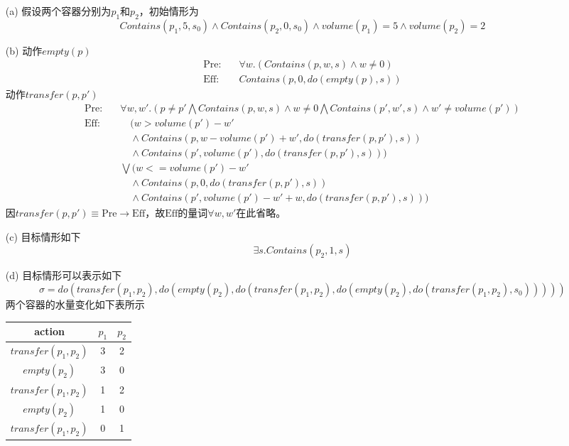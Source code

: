 \documentclass[a4paper, 11pt]{article}
\begin{document}
\begin{answer}
\begin{itemize}
    \item [(a)] 假设两个容器分别为$p_1$和$p_2$，初始情形为
    \[Contains(p_1,5,s_0)\land Contains(p_2,0,s_0)\land volume(p_1)=5\land volume(p_2)=2\]
    \item [(b)] 动作$empty(p)$
    \[\begin{aligned}
        \text{Pre:}\quad & \forall w.(Contains(p,w,s)\land w\ne 0)\\
        \text{Eff:}\quad & Contains(p,0,do(empty(p),s))
    \end{aligned}\]
    动作$transfer(p,p')$
    \[\begin{aligned}
        \text{Pre:}\quad & \forall w,w'.(p\ne p'\bigwedge Contains(p,w,s)\land w\ne 0\bigwedge Contains(p',w',s)\land w'\ne volume(p'))\\
        \text{Eff:}\quad & \quad (w > volume(p')-w'\\
        &\quad \land Contains(p,w-volume(p')+w',do(transfer(p,p'),s))\\
        &\quad \land Contains(p',volume(p'),do(transfer(p,p'),s)))\\
        &\bigvee (w <= volume(p') -w'\\
        &\quad \land Contains(p,0,do(transfer(p,p'),s))\\
        &\quad \land Contains(p',volume(p')-w'+w,do(transfer(p,p'),s)))
    \end{aligned}\]
    因$transfer(p,p')\equiv \text{Pre}\to \text{Eff}$，故$\text{Eff}$的量词$\forall w,w'$在此省略。
    \item [(c)] 目标情形如下
    \[\exists s.Contains(p_2,1,s)\]
    \item [(d)] 目标情形可以表示如下
    \[\sigma=do(transfer(p_1,p_2),do(empty(p_2),do(transfer(p_1,p_2),do(empty(p_2),do(transfer(p_1,p_2),s_0)))))\]
    两个容器的水量变化如下表所示
    \begin{center}
    \begin{tabular}{|c|c|c|}\hline
        action & $p_1$ & $p_2$\\\hline
        $transfer(p_1,p_2)$ & 3 & 2 \\\hline
        $empty(p_2)$ & 3 & 0 \\\hline
        $transfer(p_1,p_2)$ & 1 & 2 \\\hline
        $empty(p_2)$ & 1 & 0 \\\hline
        $transfer(p_1,p_2)$ & 0 & 1 \\\hline
    \end{tabular}
    \end{center}
\end{itemize}
\end{answer}
\end{document}

